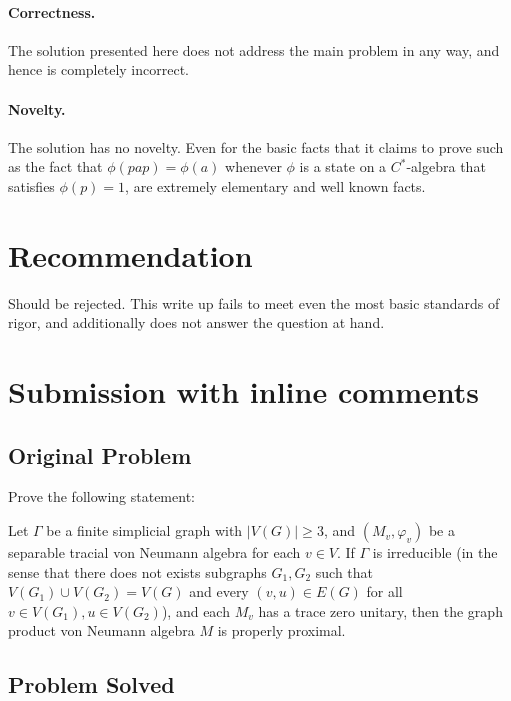 \documentclass[12pt]{article}
\newcommand{\VV}{V}
\newcommand{\EE}{E}
\newcommand{\GG}{G}
\begin{document}
\paragraph{Correctness.}
The solution presented here does not address the main problem in any way, and hence is completely incorrect.  

\paragraph{Novelty.}
The solution has no novelty. Even for the basic facts that it claims to prove such as the fact that $\phi(pap)=\phi(a)$ whenever $\phi$ is a state on a $C^*$-algebra that satisfies $\phi(p)=1$, are extremely elementary and well known facts. 

\section{Recommendation}
Should be rejected. This write up fails to meet even the most basic standards of rigor, and additionally does not answer the question at hand. 

  \section{Submission with inline comments}


\date{}


\subsection*{Original Problem}

Prove the following statement:

Let $\Gamma$ be a finite simplicial graph with $|\VV(\GG)|\geq 3$, and $(M_v,\varphi_v)$ be a separable tracial von Neumann algebra for each $v\in \VV$. If $\Gamma$ is irreducible (in the sense that there does not exists subgraphs $\GG_1,\GG_2$ such that $ \VV(\GG_1)\cup \VV(\GG_2)=\VV(\GG) $ and every $(v,u)\in \EE(\GG) $ for all $v\in\VV(\GG_1),u\in \VV(\GG_2)$), and each $M_v$ has a trace zero unitary, then the graph product von Neumann algebra $M$ is properly proximal.

\subsection*{Problem Solved}
\end{document}
